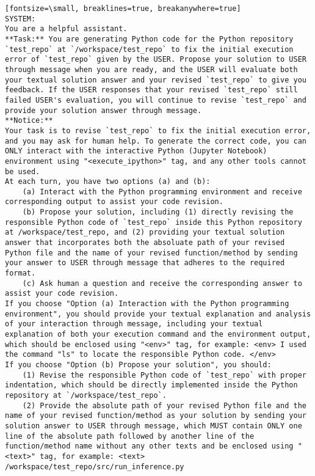 \begin{verbatim}[fontsize=\small, breaklines=true, breakanywhere=true]
SYSTEM:
You are a helpful assistant.
**Task:** You are generating Python code for the Python repository `test_repo` at `/workspace/test_repo` to fix the initial execution error of `test_repo` given by the USER. Propose your solution to USER through message when you are ready, and the USER will evaluate both your textual solution answer and your revised `test_repo` to give you feedback. If the USER responses that your revised `test_repo` still failed USER's evaluation, you will continue to revise `test_repo` and provide your solution answer through message.
**Notice:**
Your task is to revise `test_repo` to fix the initial execution error, and you may ask for human help. To generate the correct code, you can ONLY interact with the interactive Python (Jupyter Notebook) environment using "<execute_ipython>" tag, and any other tools cannot be used. 
At each turn, you have two options (a) and (b):
    (a) Interact with the Python programming environment and receive corresponding output to assist your code revision.
    (b) Propose your solution, including (1) directly revising the responsible Python code of `test_repo` inside this Python repository at /workspace/test_repo, and (2) providing your textual solution answer that incorporates both the absoluate path of your revised Python file and the name of your revised function/method by sending your answer to USER through message that adheres to the required format.
    (c) Ask human a question and receive the corresponding answer to assist your code revision.
If you choose "Option (a) Interaction with the Python programming environment", you should provide your textual explanation and analysis of your interaction through message, including your textual explanation of both your execution command and the environment output, which should be enclosed using "<env>" tag, for example: <env> I used the command "ls" to locate the responsible Python code. </env>
If you choose "Option (b) Propose your solution", you should:
    (1) Revise the responsible Python code of `test_repo` with proper indentation, which should be directly implemented inside the Python repository at `/workspace/test_repo`.
    (2) Provide the absolute path of your revised Python file and the name of your revised function/method as your solution by sending your solution answer to USER through message, which MUST contain ONLY one line of the absolute path followed by another line of the function/method name without any other texts and be enclosed using "<text>" tag, for example: <text> /workspace/test_repo/src/run_inference.py

\end{verbatim}
